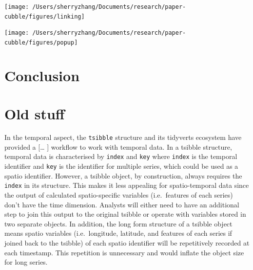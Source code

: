 \documentclass[
]{jss}
\begin{document}
\begin{CodeChunk}


\begin{center}\texttt{[image: /Users/sherryzhang/Documents/research/paper-cubble/figures/linking]} \end{center}

\end{CodeChunk}

\begin{CodeChunk}


\begin{center}\texttt{[image: /Users/sherryzhang/Documents/research/paper-cubble/figures/popup]} \end{center}

\end{CodeChunk}

\hypertarget{conclusion}{%
\section{Conclusion}\label{conclusion}}

\newpage

\hypertarget{old-stuff}{%
\section{Old stuff}\label{old-stuff}}

In the temporal aspect, the \texttt{tsibble} \citep{tsibbles} structure
and its tidyverts ecosystem have provided a {[}\ldots{} {]} workflow to
work with temporal data. In a tsibble structure, temporal data is
characterised by \texttt{index} and \texttt{key} where \texttt{index} is
the temporal identifier and \texttt{key} is the identifier for multiple
series, which could be used as a spatio identifier. However, a tsibble
object, by construction, always requires the \texttt{index} in its
structure. This makes it less appealing for spatio-temporal data since
the output of calculated spatio-specific variables (i.e.~features of
each series) don't have the time dimension. Analysts will either need to
have an additional step to join this output to the original tsibble or
operate with variables stored in two separate objects. In addition, the
long form structure of a tsibble object means spatio variables
(i.e.~longitude, latitude, and features of each series if joined back to
the tsibble) of each spatio identifier will be repetitively recorded at
each timestamp. This repetition is unnecessary and would inflate the
object size for long series.
\end{document}
